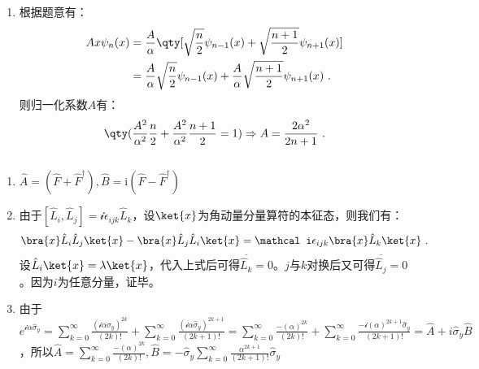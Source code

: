 
\begin{issues}
\issueDraft
\end{issues}

\subsection{ }
\begin{enumerate}
\item 根据题意有：
\begin{equation}
\begin{aligned}
Ax\psi_n(x)&=\frac{A}{\alpha}\qty[\sqrt{\frac{n}{2}}\psi_{n-1}(x)+\sqrt{\frac{n+1}{2}}\psi_{n+1}(x)] \\
&=\frac{A}{\alpha}\sqrt{\frac{n}{2}}\psi_{n-1}(x)+\frac{A}{\alpha}\sqrt{\frac{n+1}{2}}\psi_{n+1}(x)~.
\end{aligned}
\end{equation}
则归一化系数$A$有：
\begin{equation}
\qty(\frac{A^2}{{\alpha}^2}\frac{n}{2}+\frac{A^2}{{\alpha}^2}\frac{n+1}{2}=1)\Rightarrow A=\frac{2\alpha^2}{2n+1}~.
\end{equation}
\end{enumerate}
\subsection{ }
\begin{enumerate}
\item $\hat A=(\hat F+\hat F^\dagger),\hat B=\mathrm i(\hat F-\hat F^\dagger)$
\item 
由于$[\hat L_i,\hat L_j]=\mathcal i\epsilon_{ijk}\hat L_k$，设$\ket{x}$为角动量分量算符的本征态，则我们有：
\begin{equation}
\bra{x}\hat L_i\hat L_j\ket{x}-\bra{x}\hat L_j\hat L_i\ket{x}=\mathcal i\epsilon_{ijk}\bra{x}\hat L_k\ket{x}~.
\end{equation}
设$\hat L_i\ket{x}=\lambda\ket{x}$，代入上式后可得$\overline {\hat L_k}=0$。$j$与$k$对换后又可得$\overline {\hat L_j}=0$。因为$i$为任意分量，证毕。
\item 由于$e^{\mathcal i\alpha \hat {\sigma}_y}=\sum\limits^{\infty}_{k=0}\frac{(\mathcal i \alpha \hat {\sigma}_y)^{2k}}{(2k)!}+\sum\limits^{\infty}_{k=0}\frac{(\mathcal i \alpha \hat {\sigma}_y)^{2k+1}}{(2k+1)!}=\sum\limits^{\infty}_{k=0}\frac{- (\alpha )^{2k}}{(2k)!}+\sum\limits^{\infty}_{k=0}\frac{-\mathcal i( \alpha )^{2k+1}\hat {\sigma}_y}{(2k+1)!}=\hat A+i\hat {\sigma}_y \hat B$，所以$\hat A=\sum\limits^{\infty}_{k=0}\frac{- (\alpha )^{2k}}{(2k)!},\hat B=-\hat {\sigma}_y\sum\limits^{\infty}_{k=0}\frac{{\alpha}^{2k+1}}{(2k+1)!} \hat {\sigma}_y$
\end{enumerate}
\subsection{ }
\subsection{ }
\subsection{ }
